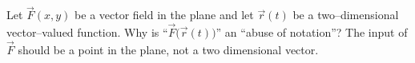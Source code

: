 {Let $\vec F(x,y)$ be a vector field in the plane and let $\vec r(t)$ be a two--dimensional vector--valued function. Why is ``$\vec F\big(\vec r(t)\big)$'' an ``abuse of notation''?
}
{The input of $\vec F$ should be a point in the plane, not a two dimensional vector.
}
